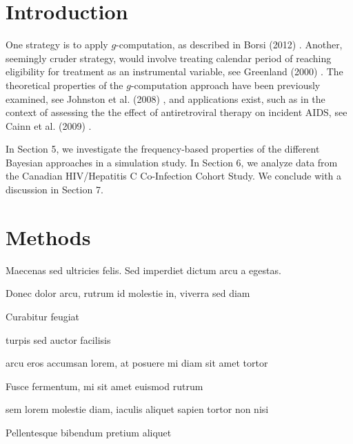 \documentclass[twoside]{article}
\begin{document}
\begin{multicols}{2} %

\section{Introduction}
\vspace{-3.5mm} 
One strategy is to apply $g$-computation, as described in Borsi (2012) \cite{borsi2012estimating} .  Another, seemingly cruder strategy, would involve treating calendar period of reaching eligibility for treatment as an instrumental variable, see Greenland (2000) \cite{greenland2000introduction}.   The theoretical properties of the $g$-computation approach have been previously examined, see Johnston et al. (2008) \cite{johnston2008use},  and applications exist, such as in the context of assessing the the effect of antiretroviral therapy on incident AIDS, see Cainn et al. (2009) \cite{cain2009effect}. 


In Section 5, we investigate the frequency-based properties of the different Bayesian approaches in a simulation study. In Section 6, we analyze data from the Canadian HIV/Hepatitis C Co-Infection Cohort Study. We conclude with a discussion in Section 7.



\section{Methods}

Maecenas sed ultricies felis. Sed imperdiet dictum arcu a egestas. 
\begin{compactitem}
\item Donec dolor arcu, rutrum id molestie in, viverra sed diam
\item Curabitur feugiat
\item turpis sed auctor facilisis
\item arcu eros accumsan lorem, at posuere mi diam sit amet tortor
\item Fusce fermentum, mi sit amet euismod rutrum
\item sem lorem molestie diam, iaculis aliquet sapien tortor non nisi
\item Pellentesque bibendum pretium aliquet
\end{compactitem}
\lipsum[4] %



\end{multicols}
\end{document}
